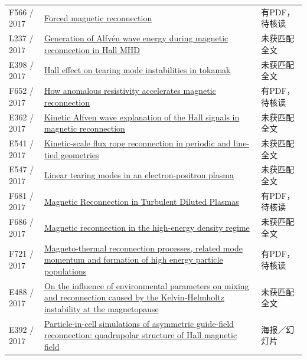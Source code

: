 \documentclass[UTF8,a4paper,11pt,openany,fontset=fandol]{ctexbook}
\begin{document}
\begin{longtable}{P{24mm}P{97mm}P{27mm}}
F566 / 2017 & \href{https://doi.org/10.1017/s0022377817000782}{Forced magnetic reconnection} & 有PDF，待核读\\

L237 / 2017 & \href{https://doi.org/10.1088/2058-6272/aa7c17}{Generation of Alfvén wave energy during magnetic reconnection in Hall MHD} & 未获匹配全文\\

E398 / 2017 & \href{https://doi.org/10.1063/1.5004430}{Hall effect on tearing mode instabilities in tokamak} & 未获匹配全文\\

F652 / 2017 & \href{https://doi.org/10.1063/1.5000071}{How anomalous resistivity accelerates magnetic reconnection} & 有PDF，待核读\\

E362 / 2017 & \href{http://ui.adsabs.harvard.edu/abs/2017AGUFMSM13B2376D/abstract}{Kinetic Alfven wave explanation of the Hall signals in magnetic reconnection} & 未获匹配全文\\

E541 / 2017 & \href{https://doi.org/10.1063/1.5007860}{Kinetic-scale flux rope reconnection in periodic and line-tied geometries} & 未获匹配全文\\

E547 / 2017 & \href{https://doi.org/10.1088/2058-6272/aa5801}{Linear tearing modes in an electron-positron plasma} & 未获匹配全文\\

F681 / 2017 & \href{https://doi.org/10.48550/arxiv.1703.01238}{Magnetic Reconnection in Turbulent Diluted Plasmas} & 有PDF，待核读\\

F686 / 2017 & \href{https://doi.org/10.1088/1361-6587/aa6803}{Magnetic reconnection in the high-energy density regime} & 未获匹配全文\\

F721 / 2017 & \href{https://doi.org/10.1088/1741-4326/aa6c70}{Magneto-thermal reconnection processes,  related mode momentum and formation of high energy particle populations} & 有PDF，待核读\\

E488 / 2017 & \href{https://doi.org/10.1063/1.4974758}{On the influence of environmental parameters on mixing and reconnection caused by the Kelvin-Helmholtz instability at the magnetopause} & 未获匹配全文\\

E392 / 2017 & \href{http://urlib.net/sid.inpe.br/mtc-m21b/2017/12.21.17.31}{Particle-in-cell simulations of asymmetric guide-field reconnection: quadrupolar structure of Hall magnetic field} & 海报／幻灯片\\


\end{longtable}
\end{document}
